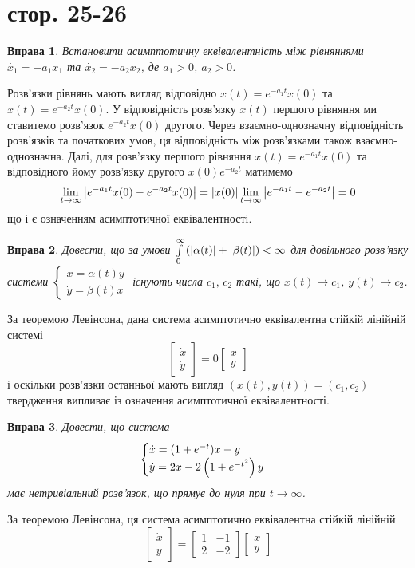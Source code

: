 \documentclass[12pt]{article} %
\newtheorem{prob}{Вправа}
\begin{document}
\section{стор. 25-26}
\setcounter{prob}{0}
\begin{prob}Встановити асимптотичну еквівалентність між рівняннями $\dot{x_1}=-a_1x_1$ та $\dot{x_2}=-a_2x_2$, де $a_1>0$, $a_2>0$.
\end{prob}
Розв’язки рівнянь мають вигляд відповідно $x(t)=e^{-a_1t}x(0)$ та $x(t)=e^{-a_2t}x(0)$. У відповідність розв’язку $x(t)$ першого
рівняння ми ставитемо розв'язок $e^{-a_2t}x(0)$ другого. Через взаємно-однозначну відповідність розв’язків та початкових умов, ця
відповідність між розв’язками також взаємно-однозначна. Далі, для розв’язку першого рівняння $x(t)=e^{-a_1t}x(0)$
та відповідного йому розв’язку другого $x(0)e^{-a_2t}$ матимемо
\[\lim_{t\to\infty}\myabs{e^{-a_1t}x(0)-e^{-a_2t}x(0)}=\myabs{x(0)}\lim_{t\to\infty}\myabs{e^{-a_1t}-e^{-a_2t}}=0\]
що і є означенням асимптотичної еквівалентності.
\begin{prob}Довести, що за умови $\int_0^\infty\mybra{\myabs{\alpha(t)}+\myabs{\beta(t)}}<\infty$ для довільного розв’язку системи
$\begin{cases}\dot{x}=\alpha(t)y\\\dot{y}=\beta(t)x\end{cases}$ існують числа $c_1,\,c_2$ такі, що $x(t)\to c_1$, $y(t)\to c_2$.
\end{prob}
За теоремою Левінсона, дана система асимптотично еквівалентна стійкій лінійній системі
\[\begin{bmatrix}\dot{x}\\\dot{y}\end{bmatrix}=0\begin{bmatrix}x\\y\end{bmatrix}\]
і оскільки розв’язки останньої мають вигляд $(x(t),y(t))=(c_1,c_2)$ твердження випливає із означення асимптотичної еквівалентності.
\begin{prob}Довести, що система
\[\begin{cases}\dot{x}=(1+e^{-t})x-y\\\dot{y}=2x-2\left(1+e^{-t^2}\right)y\end{cases}\]
має нетривіальний розв’язок, що прямує до нуля при $t\to\infty$.
\end{prob}
За теоремою Левінсона, ця система асимптотично еквівалентна стійкій лінійній
\[\begin{bmatrix}\dot{x}\\\dot{y}\end{bmatrix}=\begin{bmatrix}1&-1\\2&-2\end{bmatrix}\begin{bmatrix}x\\y\end{bmatrix}\]
\end{document}
